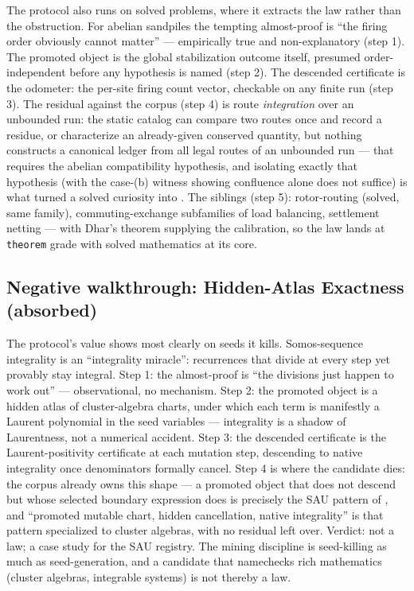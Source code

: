 \documentclass[11pt]{article}
\theoremstyle{definition}
\begin{document}
The protocol also runs on solved problems, where it extracts the law rather than the obstruction.
For abelian sandpiles the tempting almost-proof is ``the firing order obviously cannot matter'' ---
empirically true and non-explanatory (step 1). The promoted object is the global stabilization
outcome itself, presumed order-independent before any hypothesis is named (step 2). The descended
certificate is the odometer: the per-site firing count vector, checkable on any finite run
(step 3). The residual against the corpus (step 4) is route \emph{integration} over an unbounded
run: the static catalog can compare two routes once and record a residue, or characterize an
already-given conserved quantity, but nothing constructs a canonical ledger from all legal routes of
an unbounded run --- that requires the abelian compatibility hypothesis, and isolating exactly that
hypothesis (with the case-(b) witness showing confluence alone does not suffice) is what turned a
solved curiosity into . The siblings (step 5): rotor-routing (solved, same family),
commuting-exchange subfamilies of load balancing, settlement netting --- with Dhar's theorem
supplying the calibration, so the law lands at \texttt{theorem} grade with solved mathematics at its
core.

\subsection*{Negative walkthrough: Hidden-Atlas Exactness (absorbed)}

The protocol's value shows most clearly on seeds it kills. Somos-sequence integrality is an
``integrality miracle'': recurrences that divide at every step yet provably stay integral. Step 1:
the almost-proof is ``the divisions just happen to work out'' --- observational, no mechanism.
Step 2: the promoted object is a hidden atlas of cluster-algebra charts, under which each term is
manifestly a Laurent polynomial in the seed variables --- integrality is a shadow of Laurentness, not
a numerical accident. Step 3: the descended certificate is the Laurent-positivity certificate at
each mutation step, descending to native integrality once denominators formally cancel. Step 4 is
where the candidate dies: the corpus already owns this shape --- a promoted object that does not
descend but whose selected boundary expression does is precisely the SAU pattern of
, and ``promoted mutable chart, hidden cancellation, native integrality'' is that
pattern specialized to cluster algebras, with no residual left over. Verdict: not a law; a case study
for the SAU registry. The mining discipline is seed-killing as much as seed-generation, and a
candidate that namechecks rich mathematics (cluster algebras, integrable systems) is not thereby a
law.
\end{document}
